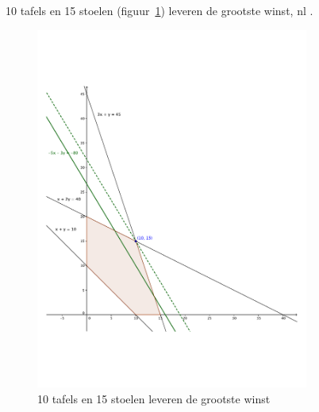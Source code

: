 \begin{Oplossing}{4.7}
        10 tafels en 15 stoelen (figuur~\ref{fig:tafelstoelen}) leveren de grootste winst, nl .
        \begin{figure}[hbtp]
\centering
\includegraphics[width=0.8\textwidth]{oefeningen/FigurenLP/Oef7.pdf}
\caption{10 tafels en 15 stoelen leveren de grootste winst}
\label{fig:tafelstoelen}
\end{figure}
\clearpage
        
\end{Oplossing}
